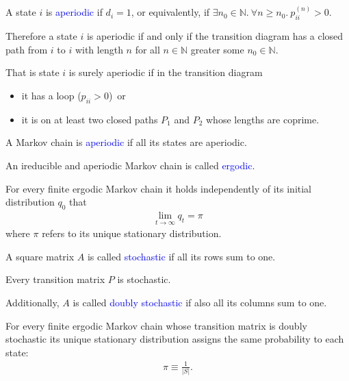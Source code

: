 \documentclass{beamer}
\def\padding{\vspace{0.5cm}}
\def\spadding{\vspace{0.25cm}}
\def\b{\textcolor{blue}}
\begin{document}
\begin{frame}
    \begin{definition}
        A state $i$ is \b{aperiodic} if $d_i = 1$\pause, or equivalently, if $\exists n_0 \in \mathbb{N}.\ \forall n \geq n_0.\ p_{ii}^{(n)} > 0$.\pause\par\spadding
        Therefore a state $i$ is aperiodic if and only if the transition diagram has a closed path from $i$ to $i$ with length $n$ for all $n \in \mathbb{N}$ greater some $n_0 \in \mathbb{N}$.\pause\par\spadding
        That is state $i$ is surely aperiodic if in the transition diagram
        \begin{itemize}
            \item it has a loop ($p_{ii} > 0$)\pause\ or
            \item it is on at least two closed paths $P_1$ and $P_2$ whose lengths are coprime.
        \end{itemize}\pause\par\padding
        A Markov chain is \b{aperiodic} if all its states are aperiodic.
    \end{definition}
\end{frame}

\begin{frame}
    \begin{definition}
        An ireducible and aperiodic Markov chain is called \b{ergodic}.
    \end{definition}\pause\par\padding
    For every finite ergodic Markov chain it holds independently of its initial distribution $q_0$ that
    \begin{align*}
        \lim_{t \to \infty} q_t = \pi
    \end{align*}
    where $\pi$ refers to its unique stationary distribution.
\end{frame}

\begin{frame}
    \begin{definition}
        A square matrix $A$ is called \b{stochastic} if all its rows sum to one.\pause\par
        Every transition matrix $P$ is stochastic.\pause\par\spadding
        Additionally, $A$ is called \b{doubly stochastic} if also all its columns sum to one.
    \end{definition}\pause\par\padding
    For every finite ergodic Markov chain whose transition matrix is doubly stochastic its unique stationary distribution assigns the same probability to each state:
    \begin{align*}
        \pi \equiv \frac{1}{|S|}.
    \end{align*}
\end{frame}
\end{document}
